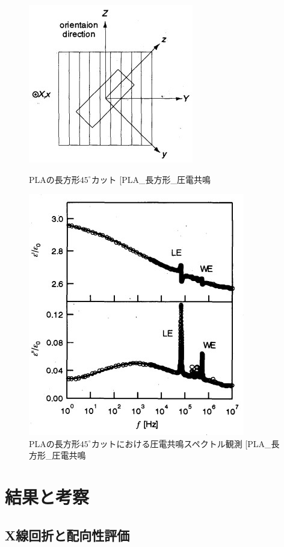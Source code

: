 \documentclass[dvipdfmx,12pt,a4paper]{jreport}
\makeatletter
\DeclareRobustCommand\cite{\unskip
    	\@ifnextchar[{\@tempswatrue\@citex}{\@tempswafalse\@citex[]}}
\makeatother
\begin{document}
			\begin{figure}[h]
				\centering
				\begin{minipage}{0.45\hsize}
					\centering
					\includegraphics{PLA_ずり圧電_長方形カット.jpg}
					\caption{PLAの長方形$45^\circ$カット\cite{PLA_長方形_圧電共鳴}}
					\label{PLA_45_cut}
				\end{minipage}
				\begin{minipage}{0.45\hsize}
					\centering
					\includegraphics{PLA_圧電共鳴スペクトル_長方形.jpg}
					\caption{PLAの長方形$45^{\circ}$カットにおける圧電共鳴スペクトル観測\cite{PLA_長方形_圧電共鳴}}
				\end{minipage}
			\end{figure}
	\chapter{結果と考察}
			\section{X線回折と配向性評価}
			\newpage
\end{document}
